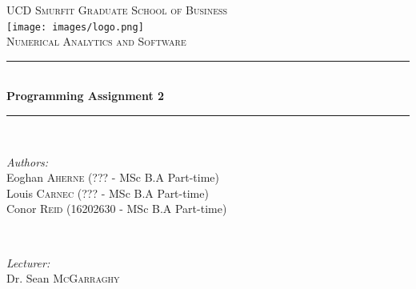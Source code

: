 \documentclass[paper=a4, fontsize=10pt]{scrartcl} %
\begin{document}
\begin{titlepage}

\newcommand{\HRule}{\rule{\linewidth}{0.5mm}} %

\center %
 

\textsc{\LARGE UCD Smurfit Graduate School of Business}\\[1.5cm] %
\texttt{[image: images/logo.png]} \\ [1cm]
\textsc{\Large Numerical Analytics and Software}\\[0.5cm] %


\HRule \\[0.4cm]
{ \LARGE \bfseries Programming Assignment 2}\\[0.4cm] %
\HRule \\[1.5cm]
 

\begin{minipage}{0.4\textwidth}
\begin{flushleft} \large
\emph{Authors:}\\
\small{Eoghan \textsc{Aherne} (??? - MSc B.A Part-time) }\\
\small{Louis \textsc{Carnec} (??? - MSc B.A Part-time)}\\
\small{Conor \textsc{Reid} (16202630 - MSc B.A Part-time)}\\
\end{flushleft}
\end{minipage}
~
\begin{minipage}{0.4\textwidth}
\begin{flushright} \large
\emph{Lecturer:} \\
\small{Dr. Sean \textsc{McGarraghy}} %
\end{flushright}
\end{minipage}\\[4cm]


\end{titlepage}
\end{document}
